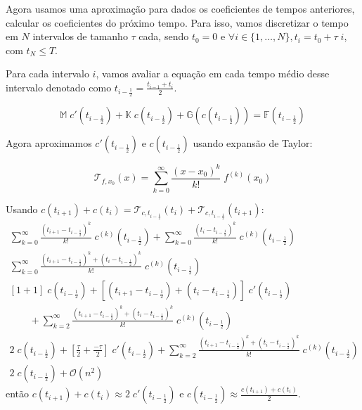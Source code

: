 \documentclass[a4paper]{article}
\begin{document}
Agora usamos uma aproximação para
dados os coeficientes de tempos anteriores,
calcular os coeficientes do próximo tempo.
Para isso,
vamos discretizar o tempo
em \(N\) intervalos de tamanho \(\tau\) cada,
sendo \(t_0 = 0\) e
\(\forall i \in \{ 1, \dots, N \}, t_i = t_0 + \tau \; i\),
com \(t_N \le T\).

Para cada intervalo \(i\),
vamos avaliar a equação em cada
tempo médio desse intervalo
denotado como
\(t_{i - \frac12} = \frac{t_{i-1} + t_i}{2}\).

\[
    \mathbb{M} \; c'(t_{i-\frac12})
    + \mathbb{K} \; c(t_{i-\frac12})
    + \mathbb{G}(c(t_{i-\frac12}))
    = \mathbb{F}(t_{i-\frac12})
\]

Agora aproximamos \(c'(t_{i-\frac12})\) e \(c(t_{i-\frac12})\)
usando expansão de Taylor:

\[
    \mathcal{T}_{f,x_0}(x)
    = \sum_{k=0}^{\infty} \frac{(x - x_0)^k}{k!} \; f^{(k)}(x_0)
\]

Usando
\(
    c(t_{i+1}) + c(t_i)
    =
    \mathcal{T}_{c,t_{i-\frac12}}(t_i)
    + \mathcal{T}_{c,t_{i-\frac12}}(t_{i+1})
\):
\[ \begin{array}{l} \displaystyle
    \sum_{k=0}^{\infty} \frac{(t_{i+1} - t_{i-\frac12})^k}{k!} \; c^{(k)}(t_{i-\frac12})
    + \sum_{k=0}^{\infty} \frac{(t_i - t_{i-\frac12})^k}{k!} \; c^{(k)}(t_{i-\frac12})
    \\ \displaystyle
    \sum_{k=0}^{\infty} \frac{(t_{i+1} - t_{i-\frac12})^k + (t_i - t_{i-\frac12})^k}{k!} \; c^{(k)}(t_{i-\frac12})
    \\ \displaystyle
    \left[1 + 1\right] \; c(t_{i-\frac12})
    + \left[ (t_{i+1} - t_{i-\frac12}) + (t_i - t_{i-\frac12}) \right] \; c'(t_{i-\frac12})
    \\\qquad \displaystyle
    + \sum_{k=2}^{\infty} \frac{(t_{i+1} - t_{i-\frac12})^k + (t_i - t_{i-\frac12})^k}{k!} \; c^{(k)}(t_{i-\frac12})
    \\ \displaystyle
    2 \; c(t_{i-\frac12})
    + \left[ \frac{\tau}{2} + \frac{-\tau}{2} \right] \; c'(t_{i-\frac12})
    + \sum_{k=2}^{\infty} \frac{(t_{i+1} - t_{i-\frac12})^k + (t_i - t_{i-\frac12})^k}{k!} \; c^{(k)}(t_{i-\frac12})
    \\ \displaystyle
    2 \; c(t_{i-\frac12})
    + \mathcal{O}(n^2)
\end{array} \]
então \(
    c(t_{i+1}) + c(t_i)
    \approx
    2 \; c'(t_{i-\frac12})
\) e \(
    c(t_{i-\frac12})
    \approx
    \frac{c(t_{i+1}) + c(t_i)}{2}
\).
\end{document}
